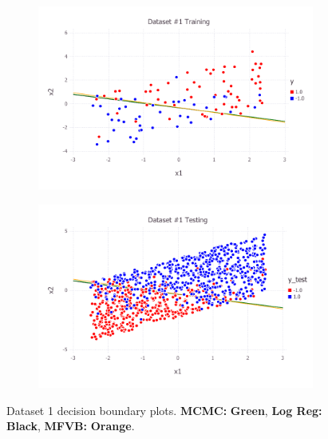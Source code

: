 \begin{figure}[h!]
\centering
    \begin{subfigure}[b]{0.45\textwidth}
	\includegraphics[scale=0.6]{figures/train_final_1.pdf}
    \end{subfigure}
    \quad
    \begin{subfigure}[b]{0.45\textwidth}
	\includegraphics[scale=0.6]{figures/test_final_1.pdf}
	\end{subfigure}
    \caption{Dataset 1 decision boundary plots. {\bf MCMC:}  {\bf \color{ao(english)} Green}, {\bf Log Reg:} {\bf \color{black} Black},  {\bf MFVB:}  {\bf \color{burntorange} Orange}.}  \label{fig:dataset_1}  
\end{figure}
